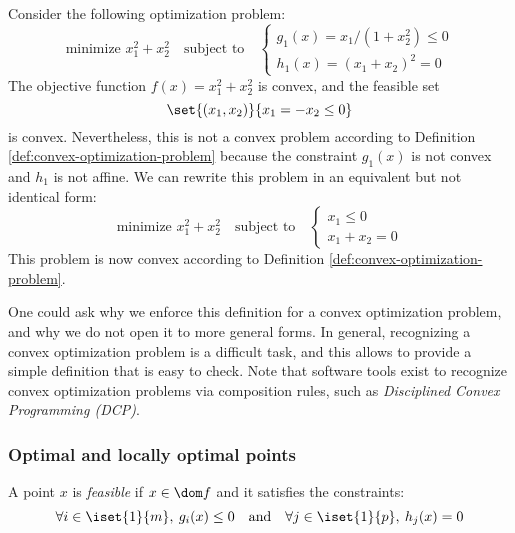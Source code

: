\begin{example}
    Consider the following optimization problem:
    \begin{equation*}
        \text{minimize } x_1^2 + x_2^2 \quad\text{subject to}\quad \begin{cases}
            g_1(x) = x_1/(1+x_2^2) \leq 0\\
            h_1(x) = (x_1+x_2)^2 = 0
        \end{cases}
    \end{equation*}
    The objective function $f(x)=x_1^2+x_2^2$ is convex, and the feasible set
    \begin{equation*}
        \set{(x_1, x_2)}{x_1=-x_2\leq0}
    \end{equation*}
    is convex. Nevertheless, this is not a convex problem according to Definition \ref{def:convex-optimization-problem} because the constraint $g_1(x)$ is not convex and $h_1$ is not affine. We can rewrite this problem in an equivalent but not identical form:
    \begin{equation*}
        \text{minimize } x_1^2 + x_2^2 \quad\text{subject to}\quad \begin{cases}
            x_1\leq0\\
            x_1+x_2=0
        \end{cases}
    \end{equation*}
    This problem is now convex according to Definition \ref{def:convex-optimization-problem}.
\end{example}

\begin{remark}
    One could ask why we enforce this definition for a convex optimization problem, and why we do not open it to more general forms. In general, recognizing a convex optimization problem is a difficult task, and this allows to provide a simple definition that is easy to check. Note that software tools exist to recognize convex optimization problems via composition rules, such as \emph{Disciplined Convex Programming (DCP)}.
\end{remark}

\subsubsection{Optimal and locally optimal points}
\begin{definition}
    A point $x$ is \emph{feasible} if $x\in\dom f$ and it satisfies the constraints:
    \begin{equation*}
        \forall i\in\iset{1}{m}, \: g_i(x)\leq0 \quad\text{and}\quad \forall j\in\iset{1}{p}, \: h_j(x)=0
    \end{equation*}
\end{definition}

